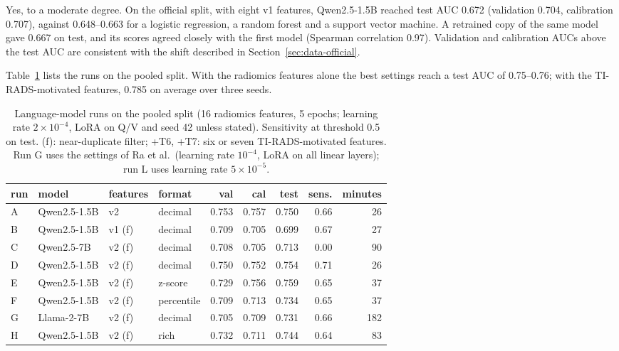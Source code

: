 Yes, to a moderate degree. On the official split, with eight v1 features, Qwen2.5-1.5B reached
test AUC 0.672 (validation 0.704, calibration 0.707), against 0.648--0.663 for a logistic
regression, a random forest and a support vector machine. A retrained copy of the same model gave
0.667 on test, and its scores agreed closely with the first model (Spearman correlation 0.97).
Validation and calibration AUCs above the test AUC are consistent with the shift described in
Section~\ref{sec:data-official}.

Table~\ref{tab:results-llm} lists the runs on the pooled split. With the radiomics features alone
the best settings reach a test AUC of 0.75--0.76; with the TI-RADS-motivated features, 0.785 on
average over three seeds.

\begin{table}[ht]
  \centering
  \small
  \setlength{\tabcolsep}{4pt}
  \caption{Language-model runs on the pooled split (16 radiomics features, 5 epochs; learning rate
           $2 \times 10^{-4}$, LoRA on Q/V and seed 42 unless stated). Sensitivity at threshold
           0.5 on test. (f): near-duplicate filter; +T6, +T7: six or seven TI-RADS-motivated
           features. Run G uses the settings of Ra et al.\ (learning rate $10^{-4}$, LoRA on all
           linear layers); run L uses learning rate $5 \times 10^{-5}$.}
  \label{tab:results-llm}
  \begin{tabular}{llllrrrrr}
    \toprule
    run & model & features & format & val & cal & test & sens. & minutes \\
    \midrule
    A & Qwen2.5-1.5B & v2            & decimal    & 0.753 & 0.757 & 0.750 & 0.66 & 26 \\
    B & Qwen2.5-1.5B & v1 (f)        & decimal    & 0.709 & 0.705 & 0.699 & 0.67 & 27 \\
    C & Qwen2.5-7B   & v2 (f)        & decimal    & 0.708 & 0.705 & 0.713 & 0.00 & 90 \\
    D & Qwen2.5-1.5B & v2 (f)        & decimal    & 0.750 & 0.752 & 0.754 & 0.71 & 26 \\
    E & Qwen2.5-1.5B & v2 (f)        & z-score    & 0.729 & 0.756 & 0.759 & 0.65 & 37 \\
    F & Qwen2.5-1.5B & v2 (f)        & percentile & 0.709 & 0.713 & 0.734 & 0.65 & 37 \\
    G & Llama-2-7B   & v2 (f)        & decimal    & 0.705 & 0.709 & 0.731 & 0.66 & 182 \\
    H & Qwen2.5-1.5B & v2 (f)        & rich       & 0.732 & 0.711 & 0.744 & 0.64 &  83 \\

\end{tabular}
\end{table}
